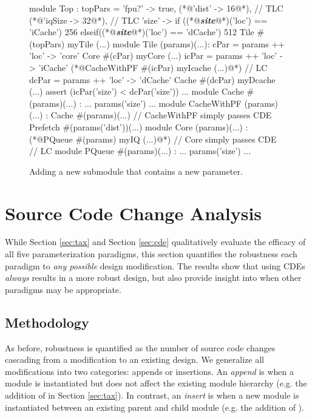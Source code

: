 \begin{figure}
\centering
\begin{phdl}
module Top :
  topPars = {'fpu?' -> true,
             (*@\textcolor[rgb]{1,0,0}{'dist' -> 16}@*),                                   // TLC
             (*@\textcolor[rgb]{1,0,0}{'iqSize -> 32}@*),                                  // TLC
             'size' -> if    ((*@\textcolor[rgb]{1,0.5,0}{\textbf{\textit{site}}}@*)('loc') == 'iCache') 256 
                       elseif((*@\textcolor[rgb]{1,0.5,0}{\textbf{\textit{site}}}@*)('loc') == 'dCache') 512}           
  Tile #(topPars) myTile (...)
module Tile (params)(...):
  cPar = params ++ {'loc' -> 'core'}
  Core #(cPar) myCore (...)
  icPar = params ++ {'loc' -> 'iCache'}
  (*@\textcolor[rgb]{1,0,0}{CacheWithPF \#(icPar) myIcache (...)}@*)                            // LC
  dcPar = params ++ {'loc' -> 'dCache'}
  Cache #(dcPar) myDcache (...)
  assert (icPar('size') < dcPar('size')) ...
module Cache #(params)(...) : ... params('size') ...
module CacheWithPF (params)(...) :
  Cache #(params)(...)        // CacheWithPF simply passes CDE
  Prefetch #(params('dist'))(...)
module Core (params)(...) :
  (*@\textcolor[rgb]{1,0,0}{PQueue \#(params) myIQ (...)}@*) // Core simply passes CDE          // LC
module PQueue #(params)(...) : ... params('size') ...
\end{phdl} 
\caption{Adding a new submodule that contains a new parameter.}
\label{fig:cde-delta}
\end{figure}

\section{Source Code Change Analysis}
\label{sec:scca}

While Section \ref{sec:tax} and Section \ref{sec:cde} qualitatively evaluate the efficacy of all five parameterization paradigms, this section quantifies the robustness each paradigm to \textit{any possible} design modification. The results show that using CDEs \textit{always} results in a more robust design, but also provide insight into when other paradigms may be appropriate.

\subsection{Methodology}

As before, robustness is quantified as the number of source code changes cascading from a modification to an existing design. 
We generalize all modifications into two categories: appends or insertions.
An \emph{append} is when a module is instantiated but does not affect the existing module hierarchy (e.g. the addition of  in Section \ref{sec:tax}).
In contrast, an \emph{insert} is when a new module is instantiated between an existing parent and child module (e.g. the addition of ). 

